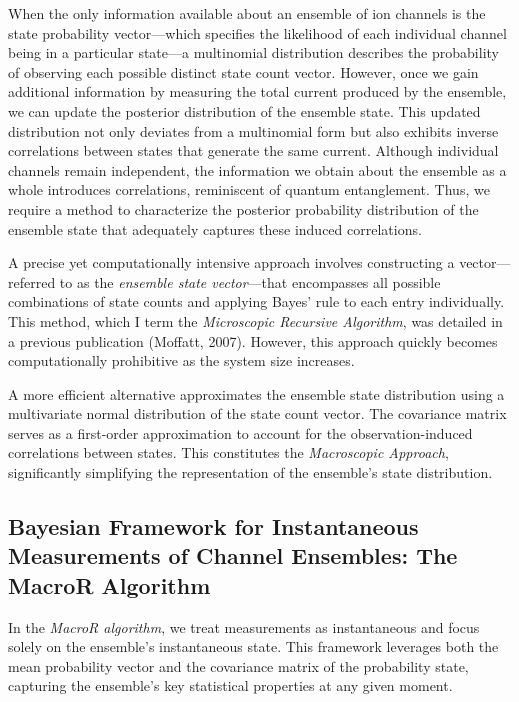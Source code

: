 \documentclass[pdflatex,sn-mathphys-num]{sn-jnl}%
\theoremstyle{thmstyleone}%
\theoremstyle{thmstyletwo}%
\theoremstyle{thmstylethree}%
\begin{document}
When the only information available about an ensemble of ion channels is the state probability vector—which specifies the likelihood of each individual channel being in a particular state—a multinomial distribution describes the probability of observing each possible distinct state count vector. However, once we gain additional information by measuring the total current produced by the ensemble, we can update the posterior distribution of the ensemble state. This updated distribution not only deviates from a multinomial form but also exhibits inverse correlations between states that generate the same current. Although individual channels remain independent, the information we obtain about the ensemble as a whole introduces correlations, reminiscent of quantum entanglement. Thus, we require a method to characterize the posterior probability distribution of the ensemble state that adequately captures these induced correlations.

A precise yet computationally intensive approach involves constructing a vector—referred to as the \textit{ensemble state vector}—that encompasses all possible combinations of state counts and applying Bayes' rule to each entry individually. This method, which I term the \textit{Microscopic Recursive Algorithm}, was detailed in a previous publication (Moffatt, 2007). However, this approach quickly becomes computationally prohibitive as the system size increases.

A more efficient alternative approximates the ensemble state distribution using a multivariate normal distribution of the state count vector. The covariance matrix serves as a first-order approximation to account for the observation-induced correlations between states. This constitutes the \textit{Macroscopic Approach}, significantly simplifying the representation of the ensemble's state distribution.



\subsection{Bayesian Framework for Instantaneous Measurements of Channel Ensembles: The MacroR Algorithm}

In the \textit{MacroR algorithm}, we treat measurements as instantaneous and focus solely on the ensemble's instantaneous state. This framework leverages both the mean probability vector and the covariance matrix of the probability state, capturing the ensemble's key statistical properties at any given moment.
\end{document}
